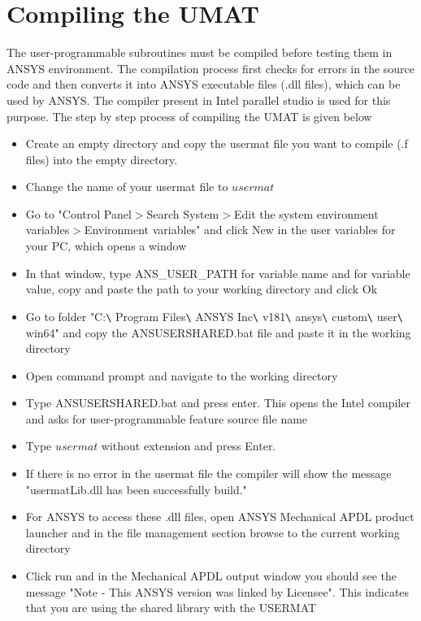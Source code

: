 \documentclass[12pt,twoside]{report}
\begin{document}
\section{Compiling the UMAT}
\indent\indent\indent The user-programmable subroutines must be compiled before testing them in ANSYS environment. The compilation process first checks for errors in the source code and then converts it into ANSYS executable files (.dll files), which can be used by ANSYS. The compiler present in Intel parallel studio is used for this purpose. The step by step process of compiling the UMAT is given below
\begin{itemize}
\item Create an empty directory and copy the usermat file you want to compile (.f files) into the empty directory.
\item Change the name of your usermat file to $usermat$
\item Go to "Control Panel$>$Search System$>$Edit the system environment variables$>$Environment variables" and click New in the user variables for your PC, which opens a window
\item In that window, type ANS\_USER\_PATH for variable name and for variable value, copy and paste the path to your working directory and click Ok
\item Go to folder "C:\texttt{\textbackslash} Program Files\texttt{\textbackslash} ANSYS Inc\texttt{\textbackslash} v181\texttt{\textbackslash} ansys\texttt{\textbackslash} custom\texttt{\textbackslash} user\texttt{\textbackslash} win64" and copy the ANSUSERSHARED.bat file and paste it in the working directory
\item Open command prompt and navigate to the working directory
\item Type ANSUSERSHARED.bat and press enter. This opens the Intel compiler and asks for user-programmable feature source file name
\item Type $usermat$ without extension and press Enter.
\item If there is no error in the usermat file the compiler will show the message "usermatLib.dll has been successfully build."  
\item For ANSYS to access these .dll files, open ANSYS Mechanical APDL product launcher and in the file management section browse to the current working directory
\item Click run and in the Mechanical APDL output window you should see the message "Note - This ANSYS version was linked by Licensee". This indicates that you are using the shared library with the USERMAT\\
\end{itemize} 
\end{document}
